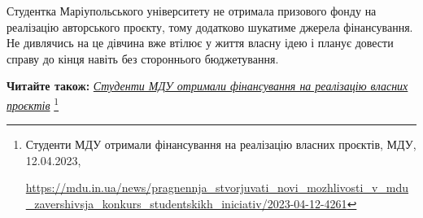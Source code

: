 Студентка Маріупольського університету не отримала призового фонду на
реалізацію авторського проєкту, тому додатково шукатиме джерела фінансування.
Не дивлячись на це дівчина вже втілює у життя власну ідею і планує довести
справу до кінця навіть без стороннього бюджетування.

\textbf{Читайте також:} \href{https://mdu.in.ua/news/pragnennja_stvorjuvati_novi_mozhlivosti_v_mdu_zavershivsja_konkurs_studentskikh_iniciativ/2023-04-12-4261}{\emph{Студенти МДУ отримали фінансування на реалізацію власних проєктів}}%
\footnote{Студенти МДУ отримали фінансування на реалізацію власних проєктів, МДУ, 12.04.2023, \par%
\url{https://mdu.in.ua/news/pragnennja_stvorjuvati_novi_mozhlivosti_v_mdu_zavershivsja_konkurs_studentskikh_iniciativ/2023-04-12-4261}%
}

